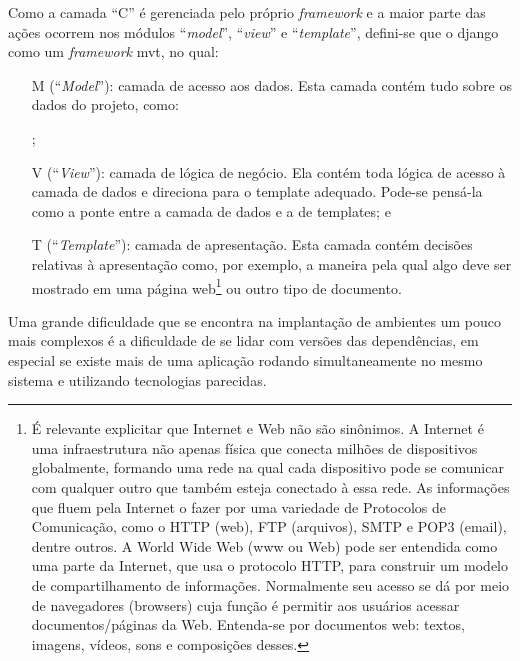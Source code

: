 Como a camada ``C'' é gerenciada pelo próprio \textit{framework} e a maior parte das ações ocorrem nos módulos ``\textit{model}'', ``\textit{view}'' e ``\textit{template}'', defini-se que o \gls{django} como um \textit{framework} \gls{mvt}, no qual:
    \begin{itemize}
	    \item[M](``\textit{Model}''): camada de acesso aos dados. Esta camada contém tudo sobre os dados do projeto, como:
            ;
        \item[V](``\textit{View}''): camada de lógica de negócio. Ela contém toda lógica de acesso à camada de dados e direciona para o template adequado. Pode-se pensá-la como a ponte entre a camada de dados e a de templates; e
        \item[T](``\textit{Template}''): camada de apresentação. Esta camada contém decisões relativas à apresentação como, por exemplo, a maneira pela qual algo deve ser mostrado em uma página web\footnote{É relevante explicitar que Internet e Web não são sinônimos. A Internet é uma infraestrutura não apenas física que conecta milhões de dispositivos globalmente, formando uma rede na qual cada dispositivo pode se comunicar com qualquer outro que também esteja conectado à essa rede. As informações que fluem pela Internet o fazer por uma variedade de Protocolos de Comunicação, como o HTTP (web), FTP (arquivos), SMTP e POP3 (email), dentre outros. A World Wide Web (www ou Web) pode ser entendida como uma parte da Internet, que usa o protocolo HTTP, para construir um modelo de compartilhamento de informações. Normalmente seu acesso se dá por meio de navegadores (browsers) cuja função é permitir aos usuários acessar documentos/páginas da Web. Entenda-se por documentos web: textos, imagens, vídeos, sons e composições desses.} ou outro tipo de documento.
\end{itemize}

Uma grande dificuldade que se encontra na implantação de ambientes um pouco mais complexos é a dificuldade de se lidar com versões das dependências, em especial se existe mais de uma aplicação rodando simultaneamente no mesmo sistema e utilizando tecnologias parecidas.

